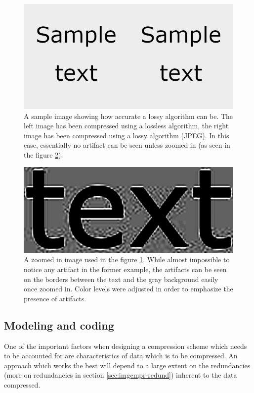 \documentclass[thesis=M,english]{FITthesis}[2012/10/20]
\begin{document}
\begin{figure}[h]
  \centering
  \includegraphics{imgs/sampletext-comparison}
  \caption{A sample image showing how accurate a lossy algorithm can be. The left image
           has been compressed using a lossless algorithm, the right image has been
           compressed using a lossy algorithm (JPEG). In this case, essentially
           no artifact can be seen unless zoomed in (as seen in the figure \ref{fig:jfifartifact}).}
  \label{fig:jfifvspng-sample}
\end{figure}

\begin{figure}[h]
  \centering
  \includegraphics[scale=0.3]{imgs/text-artifacts}
  \caption{A zoomed in image used in the figure \ref{fig:jfifvspng-sample}. While
           almost impossible to notice any artifact in the former example,
           the artifacts can be seen on the borders between the text and the
           gray background easily once zoomed in. Color levels were adjusted
           in order to emphasize the presence of artifacts.}
  \label{fig:jfifartifact}
\end{figure}


\subsection{Modeling and coding}
One of the important factors when designing a compression scheme which needs to
be accounted for are characteristics of data which is to be compressed. An approach
which works the best will depend to a large extent on the redundancies (more on
redundancies in section \ref{sec:imgcmpr-redund}) inherent to the data compressed.
\\
\end{document}
